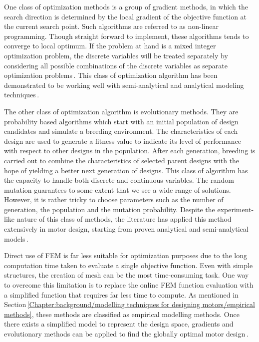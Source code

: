         
        One class of optimization methods is a group of gradient methods, in which the search direction is determined by the local gradient of the objective function at the current search point. Such algorithms are referred to as non-linear programming. Though straight forward to implement, these algorithms tends to converge to local optimum. If the problem at hand is a mixed integer optimization problem, the discrete variables will be treated separately by considering all possible combinations of the discrete variables as separate optimization problems\,\cite{Ruddy2015a}. This class of optimization algorithm has been demonstrated to be working well with semi-analytical and analytical modeling techniques\,\cite{Overboom2010,Aleksandrov2018,Fang2008}. 
        
        
        The other class of optimization algorithm is evolutionary methods. They are probability based algorithms which start with an initial population of design candidates and simulate a breeding environment. The characteristics of each design are used to generate a fitness value to indicate its level of performance with respect to other designs in the population. After each generation, breeding is carried out to combine the characteristics of selected parent designs with the hope of yielding a better next generation of designs. This class of algorithm has the capacity to handle both discrete and continuous variables. The random mutation guarantees to some extent that we see a wide range of solutions. However, it is rather tricky to choose parameters such as the number of generation, the population and the mutation probability. Despite the experiment-like nature of this class of methods, the literature has applied this method extensively in motor design, starting from proven analytical and semi-analytical models\,\cite{Isfahani2007,Li2014,Mallik2017,RuiHuang2008}.
        
        
        Direct use of \acs{FEM} is far less suitable for optimization purposes due to the long computation time taken to evaluate a single objective function. Even with simple structures, the creation of mesh can be the most time-consuming task. One way to overcome this limitation is to replace the online \acs{FEM} function evaluation with a simplified function that requires far less time to compute. As mentioned in Section\,\ref{Chapter:background/modelling techniques for designing motors/empirical methods}, these methods are classified as empirical modelling methods. Once there exists a simplified model to represent the design space, gradients and evolutionary methods can be applied to find the globally optimal motor design\,\cite{Ashabani2010,Lee2012,Giurgea2007,Hasanien2010, Hasanien2011,Zhang2017}. 
